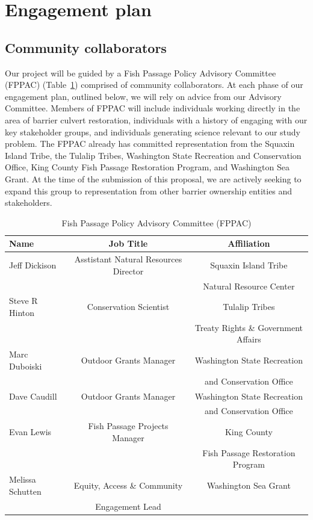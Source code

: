 \documentclass[12pt]{elsarticle}
\begin{document}
%
\section{Engagement plan \label{sec:engage}}

\subsection*{Community collaborators} 

Our project will be guided by a Fish Passage Policy Advisory Committee (FPPAC) (Table~\ref{tab:sab}) comprised of community collaborators. At each phase of our engagement plan, outlined below, we will rely on advice from our Advisory Committee. Members of FPPAC will include individuals working directly in the area of barrier culvert restoration, individuals with a history of engaging with our key stakeholder groups, and individuals generating science relevant to our study problem. The FPPAC already has committed representation from the Squaxin Island Tribe, the Tulalip Tribes, Washington State Recreation and Conservation Office, King County Fish Passage Restoration Program, and Washington Sea Grant. At the time of the submission of this proposal, we are actively seeking to expand this group to representation from other barrier ownership entities and stakeholders. 

\begin{table}[h]
\caption{Fish Passage Policy Advisory Committee (FPPAC) \label{tab:sab}}
\centering
\begin{tabular}{lcc}\hline
 Name & Job Title & Affiliation  \\\hline
Jeff Dickison& Asstistant Natural Resources Director &  Squaxin Island Tribe\\
& & Natural Resource Center\\
\rowcolor[gray]{.9} Steve R Hinton &  Conservation Scientist&  Tulalip Tribes  \\
\rowcolor[gray]{.9}& &Treaty Rights \& Government Affairs\\
Marc Duboiski & Outdoor Grants Manager & Washington State Recreation\\
& & and Conservation Office\\
\rowcolor[gray]{.9}Dave Caudill & Outdoor Grants Manager & Washington State Recreation\\
\rowcolor[gray]{.9}& & and Conservation Office\\
Evan Lewis &  Fish Passage Projects Manager&  King County  \\
& & Fish Passage Restoration Program\\
\rowcolor[gray]{.9}Melissa Schutten & Equity, Access \& Community  & Washington Sea Grant \\
\rowcolor[gray]{.9}& Engagement Lead & \\
\hline
\end{tabular}
\end{table}
\end{document}
